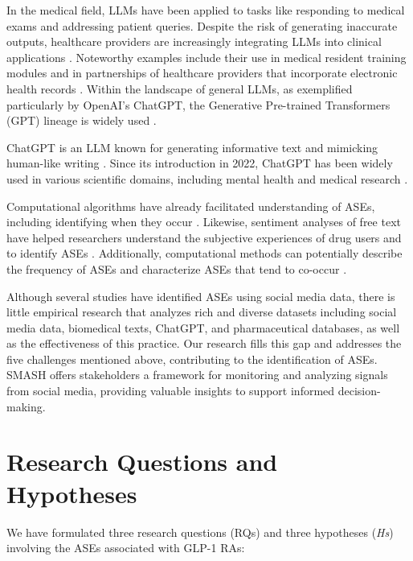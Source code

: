 \documentclass[referee,bst/sn-basic]{sn-jnl}%
\theoremstyle{thmstyletwo}%
\theoremstyle{thmstylethree}%
\begin{document}
In the medical field, LLMs have been applied to tasks like responding to medical exams and addressing patient queries.
Despite the risk of generating inaccurate outputs, healthcare providers are increasingly integrating LLMs into clinical applications \cite{lee2023benefits}. 
Noteworthy examples include their use in medical resident training modules and in partnerships of healthcare providers that incorporate electronic health records \cite{statnews-chatgpt4-2023}. 
Within the landscape of general LLMs, as exemplified particularly by OpenAI’s ChatGPT, the Generative Pre-trained Transformers (GPT) lineage is widely used  \cite{brown2020language}.

ChatGPT is an LLM known for generating informative text and mimicking human-like writing \cite{brown2020language}. 
Since its introduction in 2022, ChatGPT has been widely used in various scientific domains, including mental health \cite{bartal2024ai, lamichhane2023evaluation} and medical research \cite{ruksakulpiwat2023using}.

Computational algorithms have already facilitated understanding of ASEs, including identifying when they occur \cite{trajanov2023review}.
Likewise, sentiment analyses of free text have helped researchers understand the subjective experiences of drug users and to identify ASEs  \cite{korkontzelos2016analysis,xie2022understanding}. 
Additionally, computational methods can potentially describe the frequency of ASEs and characterize ASEs that tend to co-occur \cite{trajanov2023review}. 

Although several studies have identified ASEs using social media data, there is little empirical research that analyzes rich and diverse datasets including social media data, biomedical texts, ChatGPT, and pharmaceutical databases, as well as the effectiveness of this practice. 
Our research fills this gap and addresses the five challenges mentioned above, contributing to the identification of ASEs. 
SMASH offers stakeholders a framework for monitoring and analyzing signals from social media, providing valuable insights to support informed decision-making.


\section{Research Questions and Hypotheses}
\label{sect:RQ}
We have formulated three research questions (RQs) and three hypotheses (\textit{Hs}) involving the ASEs associated with GLP-1 RAs:
\end{document}
